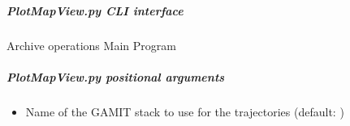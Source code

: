 \documentclass[letterpaper,10pt,english]{sphinxmanual}
\begin{document}
\subparagraph{PlotMapView.py \sphinxhyphen{} CLI interface}
\label{\detokenize{pgamit.com:PlotMapView.py---CLI-interface}}
\sphinxAtStartPar
Archive operations Main Program

\begin{sphinxVerbatim}[commandchars=\\\{\}]
 \PYG{p}{[}\PYG{p}{]} \PYG{p}{[}   \PYG{p}{[}  \PYG{p}{]}\PYG{p}{]} \PYG{p}{[} \PYG{p}{]}
               \PYG{p}{[}  \PYG{p}{[}\PYG{p}{]} \PYG{p}{[}\PYG{p}{]}  \PYG{p}{[}\PYG{p}{]}
               \PYG{p}{[}\PYG{p}{]}  \PYG{p}{[} \PYG{p}{[}\PYG{p}{]} \PYG{p}{[}\PYG{p}{]} 
               \PYG{p}{[}\PYG{p}{]} \PYG{p}{[}\PYG{p}{]}  \PYG{p}{]}\PYG{p}{]} \PYG{p}{[} \PYG{p}{]}
               \PYG{p}{[} \PYG{p}{]} \PYG{p}{[}\PYG{p}{]}
                
\end{sphinxVerbatim}


\subparagraph{PlotMapView.py positional arguments}
\label{\detokenize{pgamit.com:PlotMapView.py-positional-arguments}}\begin{itemize}
\item {} 
\sphinxAtStartPar
{\hyperref[\detokenize{pgamit.com:PlotMapView.py-_stack-name_}]{}} \sphinxhyphen{} Name of the GAMIT stack to use for the trajectories (default: )

\end{itemize}
\end{document}
